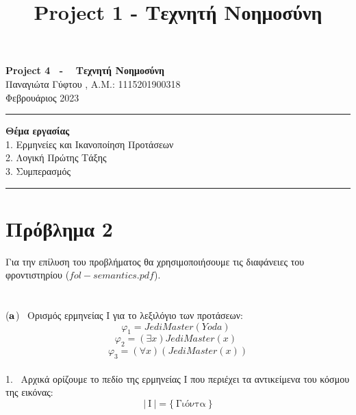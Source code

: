 \documentclass[10pt]{article}
\title{ \selectlanguage{english} Project 1 - \selectlanguage{greek} Τεχνητή Νοημοσύνη}
\begin{document}
   
   \begin{center}
        {\Large \textbf{ Project 4 \ - \  Τεχνητή Νοημοσύνη}}\\
        \vspace{1em}
        {\large Παναγιώτα Γύφτου ,   A.M.: 1115201900318  } \\
        \vspace{1em}
        {\large Φεβρουάριος 2023}
    \end{center}
    
    
    \begin{center}
        \rule{150mm}{0.2mm}
    \end{center}

    \hspace{69mm}
    \textbf{Θέμα εργασίας} \\
    
\hspace{15mm}1. Ερμηνείες και Ικανοποίηση Προτάσεων \\ 

\hspace{15mm}2. Λογική Πρώτης Τάξης \\ 

\hspace{15mm}3. Συμπερασμός


    \begin{center}
        \rule{150mm}{0.2mm}
    \end{center}

    \vspace{5mm}
    

\section*{Πρόβλημα 2}
\vspace{5mm}
Για την επίλυση του προβλήματος θα χρησιμοποιήσουμε τις διαφάνειες του φροντιστηρίου ($fol-semantics.pdf$). \\ \\ \\
($\bf a$) \normalfont \ Ορισμός ερμηνείας Ι για το λεξιλόγιο των προτάσεων:
\[
φ_1 = JediMaster(Yoda) \ \ \]
\[
φ_2 = (\exists x) JediMaster(x) \ \
\]\[
φ_3 = (\forall x) (JediMaster(x))
\] \\

1. \ Αρχικά ορίζουμε το πεδίο της ερμηνείας Ι που περιέχει τα αντικείμενα του κόσμου της εικόνας: \\ 
\[
\lvert \ \text{Ι} \ \rvert = \{ \ \text{Γιόντα} \ \}
\]
\\
\end{document}
